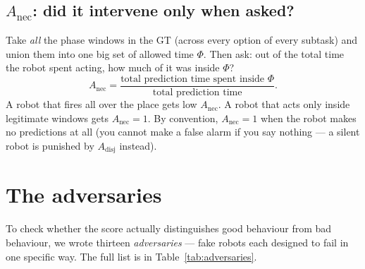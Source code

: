 \documentclass[11pt]{article}
\newcommand{\Adisj}{A_{\text{disj}}}
\newcommand{\Anec}{A_{\text{nec}}}
\begin{document}
\subsection{$\Anec$: did it intervene only when asked?}
\label{sec:anec}

Take \emph{all} the phase windows in the GT (across every option of
every subtask) and union them into one big set of allowed time
$\Phi$. Then ask: out of the total time the robot spent acting, how
much of it was inside $\Phi$?
\begin{equation*}
  \Anec = \frac{\text{total prediction time spent inside }\Phi}{\text{total prediction time}}.
\end{equation*}
A robot that fires all over the place gets low $\Anec$. A robot that
acts only inside legitimate windows gets $\Anec = 1$. By convention,
$\Anec = 1$ when the robot makes no predictions at all (you cannot
make a false alarm if you say nothing --- a silent robot is punished
by $\Adisj$ instead).

\section{The adversaries}
\label{sec:adversaries}

To check whether the score actually distinguishes good behaviour from
bad behaviour, we wrote thirteen \emph{adversaries} --- fake robots
each designed to fail in one specific way. The full list is in
Table~\ref{tab:adversaries}.
\end{document}

